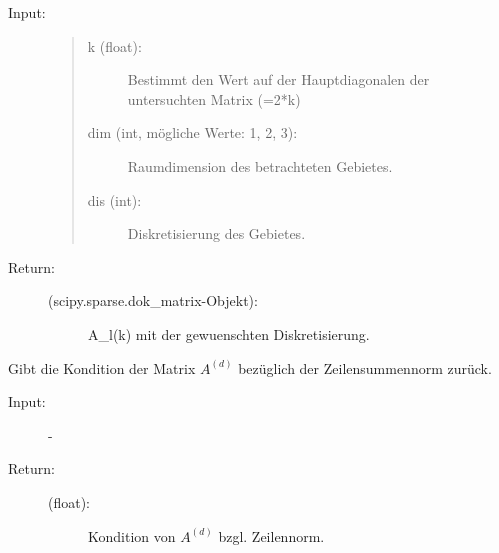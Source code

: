 \documentclass[letterpaper,10pt,ngerman, oneside, openright]{sphinxmanual}
\begin{document}
\begin{fulllineitems}
\begin{fulllineitems}
\begin{description}
\item [{Input:}] \leavevmode

\begin{quote}
\begin{description}
\item[{k (float):}] \leavevmode
Bestimmt den Wert auf der Hauptdiagonalen der untersuchten Matrix (=2*k)

\item[{dim (int, mögliche Werte: 1, 2, 3):}] \leavevmode
Raumdimension des betrachteten Gebietes.

\item[{dis (int):}] \leavevmode
Diskretisierung des Gebietes.

\end{description}
\end{quote}
\end{description}
\begin{description}
\item[{Return:}] \leavevmode\begin{description}
\item[{(scipy.sparse.dok\_matrix-Objekt):}] \leavevmode
A\_l(k) mit der gewuenschten Diskretisierung.

\end{description}

\end{description}

\end{fulllineitems}


\begin{fulllineitems}
\label{\detokenize{index:sparse_erw.Sparse.kond_a_d_zs}}
Gibt die Kondition der Matrix $A^{(d)}$ bezüglich der Zeilensummennorm zurück.

\begin{description}
\item [{Input:}] -
\end{description}
\begin{description}
\item[{Return:}] \leavevmode\begin{description}
\item[{(float):}] \leavevmode
Kondition von $A^{(d)}$ bzgl. Zeilennorm.

\end{description}


\end{description}
\end{fulllineitems}
\end{fulllineitems}
\end{document}
